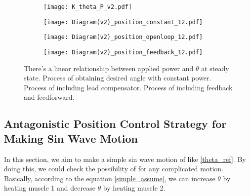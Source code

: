 \begin{figure}[b]
	\centering
	\begin{minipage}{0.3\textwidth}
		\begin{subfigure}{\linewidth}
			\centering
			\texttt{[image: K\_theta\_P\_v2.pdf]}
			\caption{\label{KthetaP}}
		\end{subfigure}
	\end{minipage}%
	\begin{minipage}{0.65\textwidth}
		\begin{subfigure}{\linewidth}
			\texttt{[image: Diagram(v2)\_position\_constant\_12.pdf]}
			\caption{\label{AntaControl_constant}}
		\end{subfigure}
		
		\begin{subfigure}{\linewidth}
			\texttt{[image: Diagram(v2)\_position\_openloop\_12.pdf]}
			\caption{\label{position_open_loop}}
		\end{subfigure}
		
		\begin{subfigure}{\linewidth}
			\texttt{[image: Diagram(v2)\_position\_feedback\_12.pdf]}
			\caption{\label{position_closed_loop}}
		\end{subfigure}
	\end{minipage}
	\caption[Block diagrams for \apc]{ There's a linear relationship between applied power and $\theta$ at steady state.  Process of obtaining desired angle with constant power.  Process of \apc including lead compensator.  Process of \apc including feedback and feedforward.}
	\label{anta_position_diagrams}
\end{figure}


\subsection{Antagonistic Position Control Strategy for Making Sin Wave Motion}
In this section, we aim to make a simple sin wave motion of \anta like \eqref{theta_ref}. By doing this, we could check the possibility of \apc for any complicated motion. Basically, according to the equation \eqref{simple_assume}, we can increase $\theta$ by heating muscle 1 and decrease $\theta$ by heating muscle 2. 

